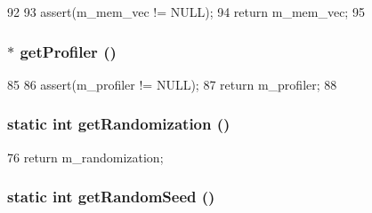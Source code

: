 \begin{DoxyCode}
92     {
93         assert(m_mem_vec != NULL);
94         return m_mem_vec;
95     }
\end{DoxyCode}
\hypertarget{classRubySystem_a1dc2a271b826284445c889f60c62b2fb}{
\subsubsection[{getProfiler}]{$\ast$ getProfiler ()}}
\label{classRubySystem_a1dc2a271b826284445c889f60c62b2fb}



\begin{DoxyCode}
85     {
86         assert(m_profiler != NULL);
87         return m_profiler;
88     }
\end{DoxyCode}
\hypertarget{classRubySystem_a2c9e274659748daf59b6e960456cea85}{
\subsubsection[{getRandomization}]{\setlength{\rightskip}{0pt plus 5cm}static int getRandomization ()}}
\label{classRubySystem_a2c9e274659748daf59b6e960456cea85}



\begin{DoxyCode}
76 { return m_randomization; }
\end{DoxyCode}
\hypertarget{classRubySystem_aed9d96608b2dca650ff1cece99ace997}{
\subsubsection[{getRandomSeed}]{\setlength{\rightskip}{0pt plus 5cm}static int getRandomSeed ()}}
\label{classRubySystem_aed9d96608b2dca650ff1cece99ace997}



